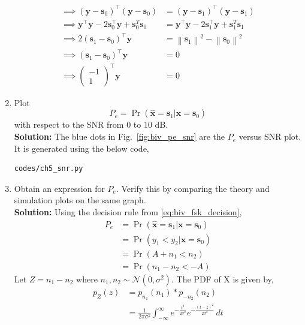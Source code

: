 \documentclass[journal,10pt,twocolumn]{article}
\newcommand\figref{Fig.~\ref}
\providecommand{\mbf}{\mathbf}
\providecommand{\pr}[1]{\ensuremath{\Pr\left(#1\right)}}
\providecommand{\brak}[1]{\ensuremath{\left(#1\right)}}
\providecommand{\norm}[1]{\left\lVert#1\right\rVert}
\newcommand{\solution}{\noindent \textbf{Solution: }}
\newcommand{\myvec}[1]{\ensuremath{\begin{pmatrix}#1\end{pmatrix}}}
\providecommand{\gauss}[2]{\mathcal{N}\ensuremath{\left(#1,#2\right)}}
\let\vec\mathbf
\begin{document}
\begin{enumerate}
\begin{align*}
	\implies \brak{\vec{y}-\vec{s}_0}^\top \brak{\vec{y}-\vec{s}_0} &= \brak{\vec{y}-\vec{s}_1}^\top \brak{\vec{y}-\vec{s}_1}\\
	\implies \vec{y}^\top\vec{y} - 2\vec{s}_0^\top \vec{y} + \vec{s}_0^T\vec{s}_0 &= \vec{y}^\top\vec{y} - 2\vec{s}_1^\top \vec{y} + \vec{s}_1^T\vec{s}_1\\
	\implies 2\brak{\vec{s}_1-\vec{s}_0}^\top \vec{y} &= \norm{\vec{s}_1}^2 - \norm{\vec{s}_0}^2\\
	\implies \brak{\vec{s}_1-\vec{s}_0}^\top \vec{y} &= 0\\
	\implies \myvec{-1\\1}^\top \vec{y} &= 0
\end{align*}
%
\item
Plot 
\begin{equation} 
P_e = \pr{\hat{\mbf{x}} = \mbf{s}_1|\mbf{x} = \mbf{s}_0}
\label{eq:prob_error_fsk}
\end{equation}
with respect to the SNR from 0 to 10 dB.\\
\solution The blue dots in \figref{fig:biv_pe_snr} are the $P_e$ versus SNR plot. It is generated using the below code,
\begin{lstlisting}
codes/ch5_snr.py
\end{lstlisting}
%
\item
Obtain an expression for $P_e$. Verify this by comparing the theory and simulation plots on the same graph.\\
\solution Using the decision rule from \eqref{eq:biv_fsk_decision},
\begin{align}
	\nonumber
	P_e &= \pr{\hat{\mbf{x}} = \mbf{s}_1|\mbf{x} = \mbf{s}_0}\\\nonumber
	&= \pr{y_1 < y_2|\mbf{x} = \mbf{s}_0}\\\nonumber
	&= \pr{A+n_1 < n_2}\\
	\label{eq:prob_error_fsk_inter}
	&= \pr{n_1-n_2 < -A}
\end{align}
Let $Z = n_1-n_2$ where $n_1, n_2 \sim \gauss{0}{\sigma^2}$. The PDF of X is given by,
\begin{align}
	\nonumber
	p_Z(z) &= p_{n_1}(n_1) \ast p_{-n_2}(n_2)\\\nonumber
	&= \frac{1}{2\pi\sigma^2}\int_{-\infty}^{\infty} e^{-\frac{t^2}{2\sigma^2}}e^{-\frac{(t-z)^2}{2\sigma^2}}  \,dt\\\nonumber

\end{align}
\end{enumerate}
\end{document}
